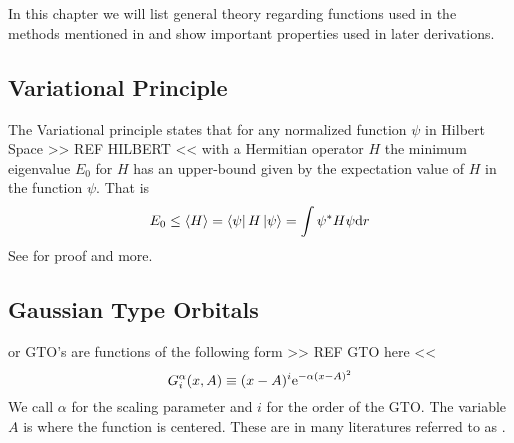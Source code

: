 \chapter{\label{chapter:2}}
    In this chapter we will list general theory regarding functions used in the
    methods mentioned in  and show important properties used
    in later derivations.

\section{Variational Principle\label{sec:varPrinc}}
    The Variational principle states that for any normalized function $\psi$ in
    Hilbert Space >> REF HILBERT << with a Hermitian operator $H$ the minimum
    eigenvalue $E_0$ for $H$ has an upper-bound given by the expectation value
    of $H$ in the function $\psi$. That is
        \begin{equation}
            E_0 \leq \left< {H} \right> = \bra{\psi}H\ket{\psi} = \int \psi^{*}H\psi \mathrm{d} r
        \end{equation}
    See \cite{GriffQuan} for proof and more.

\section{Gaussian Type Orbitals}
     or GTO's are functions of the following form
    >> REF GTO here <<
        \begin{equation}
            G^{\alpha}_{i}(x,A) \equiv (x-A)^i\mathrm{e}^{-\alpha (x-A)^2}
            \label{eq:GTOdef1d}
        \end{equation}
    We call $\alpha$ for the scaling parameter and $i$ for the order of the
    GTO. The variable $A$ is where the function is centered. These are in many
    literatures referred to as .
